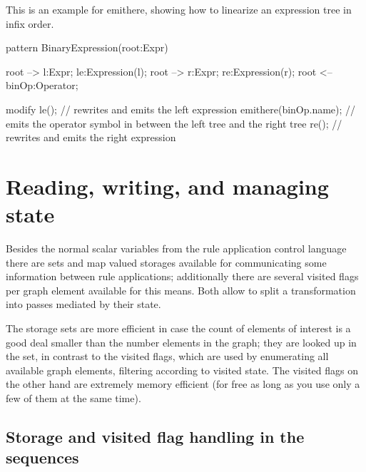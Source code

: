 \begin{example}
	This is an example for emithere, showing how to linearize an expression tree in infix order.
	\begin{grgen}
pattern BinaryExpression(root:Expr)
{
  root --> l:Expr; le:Expression(l);
  root --> r:Expr; re:Expression(r);
  root <-- binOp:Operator;
  
  modify {
    le(); // rewrites and emits the left expression
    emithere(binOp.name); // emits the operator symbol in between the left tree and the right tree
    re(); // rewrites and emits the right expression
  }
}  
	\end{grgen}
\end{example}



\section{Reading, writing, and managing state}

Besides the normal scalar variables from the rule application control language there are sets and map valued storages available for communicating some information between rule applications;
additionally there are several visited flags per graph element available for this means.
Both allow to split a transformation into passes mediated by their state.

\begin{note}
The storage sets are more efficient in case the count of elements of interest is a good deal smaller than the number elements in the graph; they are looked up in the set, in contrast to the visited flags, which are used by enumerating all available graph elements, filtering according to visited state.
The visited flags on the other hand are extremely memory efficient (for free as long as you use only a few of them at the same time).
\end{note}

\subsection{Storage and visited flag handling in the sequences}\label{sec:storages}

